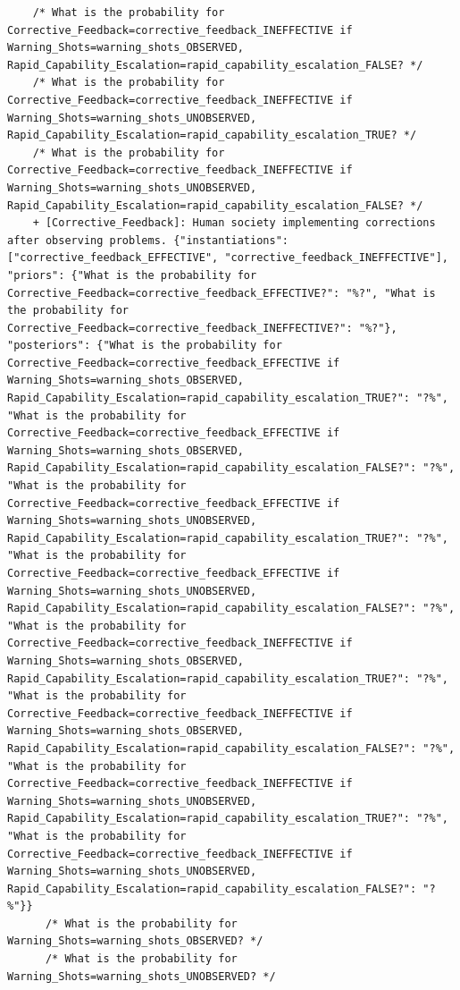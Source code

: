 \documentclass[
  11pt,
  letterpaper,
]{book}
\begin{document}
\begin{landscape}
\begin{verbatim}
    /* What is the probability for Corrective_Feedback=corrective_feedback_INEFFECTIVE if Warning_Shots=warning_shots_OBSERVED, Rapid_Capability_Escalation=rapid_capability_escalation_FALSE? */
    /* What is the probability for Corrective_Feedback=corrective_feedback_INEFFECTIVE if Warning_Shots=warning_shots_UNOBSERVED, Rapid_Capability_Escalation=rapid_capability_escalation_TRUE? */
    /* What is the probability for Corrective_Feedback=corrective_feedback_INEFFECTIVE if Warning_Shots=warning_shots_UNOBSERVED, Rapid_Capability_Escalation=rapid_capability_escalation_FALSE? */
    + [Corrective_Feedback]: Human society implementing corrections after observing problems. {"instantiations": ["corrective_feedback_EFFECTIVE", "corrective_feedback_INEFFECTIVE"], "priors": {"What is the probability for Corrective_Feedback=corrective_feedback_EFFECTIVE?": "%?", "What is the probability for Corrective_Feedback=corrective_feedback_INEFFECTIVE?": "%?"}, "posteriors": {"What is the probability for Corrective_Feedback=corrective_feedback_EFFECTIVE if Warning_Shots=warning_shots_OBSERVED, Rapid_Capability_Escalation=rapid_capability_escalation_TRUE?": "?%", "What is the probability for Corrective_Feedback=corrective_feedback_EFFECTIVE if Warning_Shots=warning_shots_OBSERVED, Rapid_Capability_Escalation=rapid_capability_escalation_FALSE?": "?%", "What is the probability for Corrective_Feedback=corrective_feedback_EFFECTIVE if Warning_Shots=warning_shots_UNOBSERVED, Rapid_Capability_Escalation=rapid_capability_escalation_TRUE?": "?%", "What is the probability for Corrective_Feedback=corrective_feedback_EFFECTIVE if Warning_Shots=warning_shots_UNOBSERVED, Rapid_Capability_Escalation=rapid_capability_escalation_FALSE?": "?%", "What is the probability for Corrective_Feedback=corrective_feedback_INEFFECTIVE if Warning_Shots=warning_shots_OBSERVED, Rapid_Capability_Escalation=rapid_capability_escalation_TRUE?": "?%", "What is the probability for Corrective_Feedback=corrective_feedback_INEFFECTIVE if Warning_Shots=warning_shots_OBSERVED, Rapid_Capability_Escalation=rapid_capability_escalation_FALSE?": "?%", "What is the probability for Corrective_Feedback=corrective_feedback_INEFFECTIVE if Warning_Shots=warning_shots_UNOBSERVED, Rapid_Capability_Escalation=rapid_capability_escalation_TRUE?": "?%", "What is the probability for Corrective_Feedback=corrective_feedback_INEFFECTIVE if Warning_Shots=warning_shots_UNOBSERVED, Rapid_Capability_Escalation=rapid_capability_escalation_FALSE?": "?%"}}
      /* What is the probability for Warning_Shots=warning_shots_OBSERVED? */
      /* What is the probability for Warning_Shots=warning_shots_UNOBSERVED? */

\end{verbatim}
\end{landscape}
\end{document}
